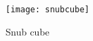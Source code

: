 \documentclass[beamer]{standalone}
\begin{document}
\begin{standaloneframe}
  \begin{center}
    \texttt{[image: snubcube]}
  \end{center}

  \pause

  \begin{center}
    Snub cube 
  \end{center}
\end{standaloneframe}
\end{document}
